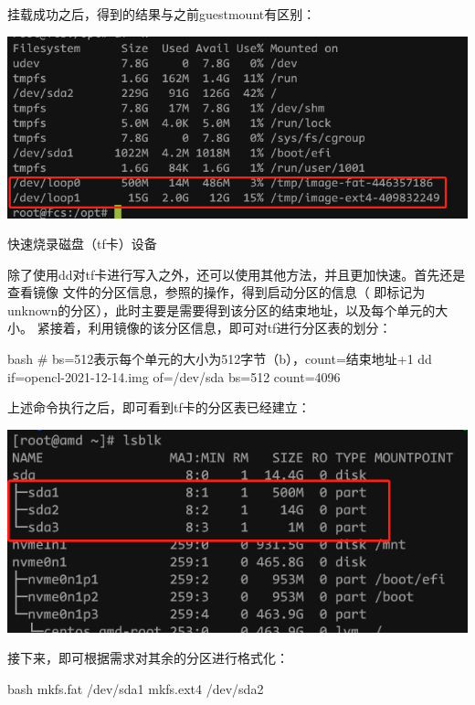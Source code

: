 \begin{outline}[enumerate]
挂载成功之后，得到的结果与之前guestmount有区别：
\par\begin{minipage}{\linewidth}
  \centering
  \includegraphics[width=\linewidth]{offset_mount.png}
  \label{fig:offset_mount}
\end{minipage}

\1 快速烧录磁盘（tf卡）设备

除了使用dd对tf卡进行写入之外，还可以使用其他方法，并且更加快速。首先还是查看镜像
文件的分区信息，参照的操作，得到启动分区的信息（
即标记为unknown的分区），此时主要是需要得到该分区的结束地址，以及每个单元的大小。
紧接着，利用镜像的该分区信息，即可对tf进行分区表的划分：
\begin{code-block}{bash}
# bs=512表示每个单元的大小为512字节（b），count=结束地址+1
dd if=opencl-2021-12-14.img of=/dev/sda bs=512 count=4096
\end{code-block}

上述命令执行之后，即可看到tf卡的分区表已经建立：
\par\begin{minipage}{\linewidth}
  \centering
  \includegraphics[width=\linewidth]{tf_partition.png}
  \label{fig:tf_partition}
\end{minipage}

接下来，即可根据需求对其余的分区进行格式化：
\begin{code-block}{bash}
mkfs.fat /dev/sda1
mkfs.ext4 /dev/sda2
\end{code-block}


\end{outline}
